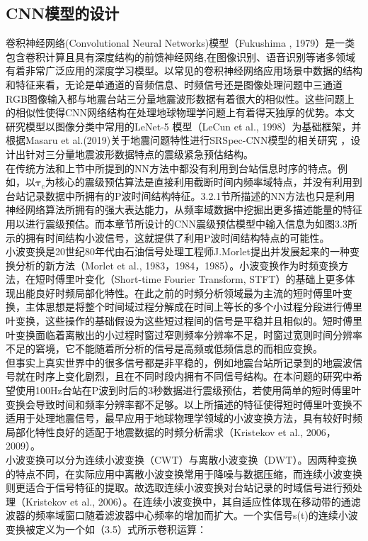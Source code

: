 \subsection{CNN模型的设计}
\indent 卷积神经网络(Convolutional Neural Networks)模型（Fukushima , 1979）是一类包含卷积计算且具有深度结构的前馈神经网络,在图像识别、语音识别等诸多领域有着非常广泛应用的深度学习模型。以常见的卷积神经网络应用场景中数据的结构和特征来看，无论是单通道的音频信息、时频信号还是图像处理问题中三通道RGB图像输入都与地震台站三分量地震波形数据有着很大的相似性。这些问题上的相似性使得CNN网络结构在处理地球物理学问题上有着得天独厚的优势。本文研究模型以图像分类中常用的LeNet-5 模型（LeCun et al., 1998）为基础框架，并根据Masaru et al.(2019)关于地震问题特性进行SRSpec-CNN模型的相关研究 ，设计出针对三分量地震波形数据特点的震级紧急预估结构。\\
\indent 在传统方法和上节中所提到的NN方法中都没有利用到台站信息时序的特点。例如，以$\mathbf{\tau}_{\mathrm{c}}$为核心的震级预估算法是直接利用截断时间内频率域特点，并没有利用到台站记录数据中所拥有的P波时间结构特征。3.2.1节所描述的NN方法也只是利用神经网络算法所拥有的强大表达能力，从频率域数据中挖掘出更多描述能量的特征用以进行震级预估。而本章节所设计的CNN震级预估模型中输入信息为如图3.3所示的拥有时间结构小波信号，这就提供了利用P波时间结构特点的可能性。\\
\indent 小波变换是20世纪80年代由石油信号处理工程师J.Morlet提出并发展起来的一种变换分析的新方法（Morlet et al., 1983，1984，1985）。小波变换作为时频变换方法，在短时傅里叶变化（Short-time Fourier Transform, STFT）的基础上更多体现出能良好时频局部化特性。在此之前的时频分析领域最为主流的短时傅里叶变换，主体思想是将整个时间域过程分解成在时间上等长的多个小过程分段进行傅里叶变换，这些操作的基础假设为这些短过程间的信号是平稳并且相似的。短时傅里叶变换面临着离散出的小过程时窗过窄则频率分辨率不足，时窗过宽则时间分辨率不足的窘境，它不能随着所分析的信号是高频或低频信息的而相应变换。\\
\indent 但事实上真实世界中的很多信号都是非平稳的，例如地震台站所记录到的地震波信号就在时序上变化剧烈，且在不同时段内拥有不同信号结构。在本问题的研究中希望使用100Hz台站在P波到时后的3秒数据进行震级预估，若使用简单的短时傅里叶变换会导致时间和频率分辨率都不足够。以上所描述的特征使得短时傅里叶变换不适用于处理地震信号，最早应用于地球物理学领域的小波变换方法，具有较好时频局部化特性良好的适配于地震数据的时频分析需求（Kristekov et al., 2006，2009）。\\
\indent 小波变换可以分为连续小波变换（CWT）与离散小波变换（DWT）。因两种变换的特点不同，在实际应用中离散小波变换常用于降噪与数据压缩，而连续小波变换则更适合于信号特征的提取。故选取连续小波变换对台站记录的时域信号进行预处理（Kristekov et al., 2006）。在连续小波变换中，其自适应性体现在移动带的通滤波器的频率域窗口随着滤波器中心频率的增加而扩大。一个实信号s(t)的连续小波变换被定义为一个如（3.5）式所示卷积运算：\\
